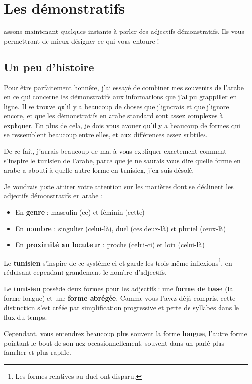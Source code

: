 \chapter{Les démonstratifs}
assons maintenant quelques instants à parler des adjectifs démonstratifs. Ils vous permettront de mieux désigner ce qui vous entoure !

\section{Un peu d'histoire}
Pour être parfaitement honnête, j'ai essayé de combiner mes souvenirs de l'arabe en ce qui concerne les démonstratifs aux informations que j'ai pu grappiller en ligne. Il se trouve qu'il y a beaucoup de choses que j'ignorais et que j'ignore encore, et que les démonstratifs en arabe standard sont assez complexes à expliquer. En plus de cela, je dois vous avouer qu'il y a beaucoup de formes qui se ressemblent beaucoup entre elles, et aux différences assez subtiles.

De ce fait, j'aurais beaucoup de mal à vous expliquer exactement comment s'inspire le tunisien de l'arabe, parce que je ne saurais vous dire quelle forme en arabe a abouti à quelle autre forme en tunisien, j'en suis désolé. 

Je voudrais juste attirer votre attention sur les manières dont se déclinent les adjectifs démonstratifs en arabe : 

\begin{itemize}
    \item En \textbf{genre} : masculin (ce) et féminin (cette)
    \item En \textbf{nombre} : singulier (celui-là), duel (ces deux-là) et pluriel (ceux-là)
    \item En \textbf{proximité au locuteur} : proche (celui-ci) et loin (celui-là)
\end{itemize}

Le \textbf{tunisien} s'inspire de ce système-ci et garde les trois même inflexions\footnote{Les formes relatives au duel ont disparu.}, en réduisant cependant grandement le nombre d'adjectifs.

Le \textbf{tunisien} possède deux formes pour les adjectifs : une \textbf{forme de base} (la forme longue) et une \textbf{forme abrégée}. Comme vous l'avez déjà compris, cette distinction s'est créée par simplification progressive et perte de syllabes dans le flux du temps. 

Cependant, vous entendrez beaucoup plus souvent la forme \textbf{longue}, l'autre forme pointant le bout de son nez occasionnellement, souvent dans un parlé plus familier et plus rapide.

